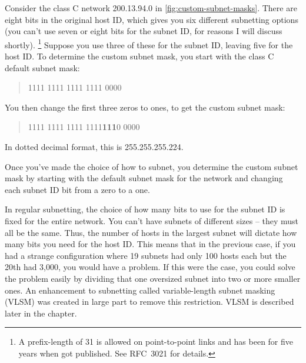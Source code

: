 Consider the class C network 200.13.94.0 in \cref{fig:custom-subnet-masks}.
There are eight bits in the original host ID, which gives you six different subnetting options
(you can't use seven or eight bits for the subnet ID, for reasons I will discuss shortly).%
   \footnote{A prefix-length of 31 is allowed on point-to-point links and has been for five years when \cite{kozierok05} got published. See RFC~3021 for details.}
Suppose you use three of these for the subnet ID, leaving five for the host ID.
To determine the custom subnet mask, you start with the class C default subnet mask:

\begin{quote}
1111 1111 1111 1111 0000
\end{quote}

You then change the first three zeros to ones, to get the custom subnet mask:

\begin{quote}
1111 1111 1111 1111\quad \textbf{111}0 0000
\end{quote}
In dotted decimal format, this is 255.255.255.224.


\begin{note}
Once you've made the choice of how to subnet, you determine the custom subnet mask by starting with
the default subnet mask for the network and changing each subnet ID bit from a zero to a one.
\end{note}

\begin{note}
In regular subnetting, the choice of how many bits to use for the subnet ID is fixed for the entire network.
You can't have subnets of different sizes -- they must all be the same.
Thus, the number of hosts in the largest subnet will dictate how many bits you need for the host ID.
This means that in the previous case, if you had a strange configuration where 19 subnets had only 100 hosts each but the 20th had 3,000, you would have a problem.
If this were the case, you could solve the problem easily by dividing that one oversized subnet into two or more smaller ones.
An enhancement to subnetting called variable-length subnet masking (VLSM) was created in large part to remove this restriction.
VLSM is described later in the chapter.
\end{note}



